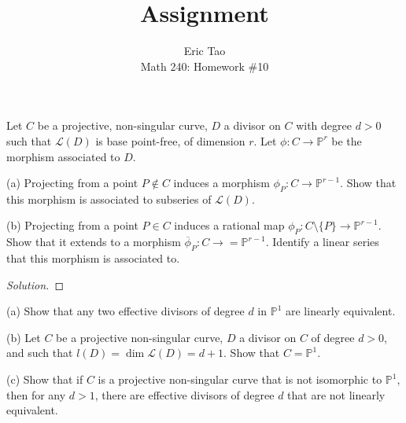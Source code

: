 \documentclass[10pt]{article}
\newenvironment{problem}[2][Problem]{\begin{trivlist}
\item[\hskip \labelsep {\bfseries #1}\hskip \labelsep {\bfseries #2.}]}{\end{trivlist}}
\begin{document}
 
\title{Assignment}
\author{Eric Tao\\
Math 240: Homework \#10}
\maketitle
 
\begin{problem}{10.1}

Let $C$ be a projective, non-singular curve, $D$ a divisor on $C$ with degree $d > 0$ such that $\mathcal{L}(D)$ is base point-free, of dimension $r$. Let $\phi: C \to \mathbb{P}^r$ be the morphism associated to $D$.

(a) Projecting from a point $P \not \in C$ induces a morphism $\phi_P : C \to \mathbb{P}^{r-1}$. Show that this morphism is associated to subseries of $\mathcal{L}(D)$.

(b)  Projecting from a point $P \in C$ induces a rational map $\phi_P : C \setminus \{ P \} \to \mathbb{P}^{r-1}$. Show that it extends to a morphism $\overline{\phi}_P: C \to= \mathbb{P}^{r-1}$. Identify a linear series that this morphism is associated to.

\end{problem}

\begin{proof}[Solution]


\end{proof}

\begin{problem}{10.2}

(a) Show that any two effective divisors of degree $d$ in $\mathbb{P}^1$ are linearly equivalent.

(b) Let $C$ be a projective non-singular curve, $D$ a divisor on $C$ of degree $d > 0$, and such that $l(D) = \dim \mathcal{L}(D) = d + 1$. Show that $C = \mathbb{P}^1$. 

(c) Show that if $C$ is a projective non-singular curve that is not isomorphic to $\mathbb{P}^1$, then for any $d > 1$, there are effective divisors of degree $d$ that are not linearly equivalent.

\end{problem}
\end{document}
